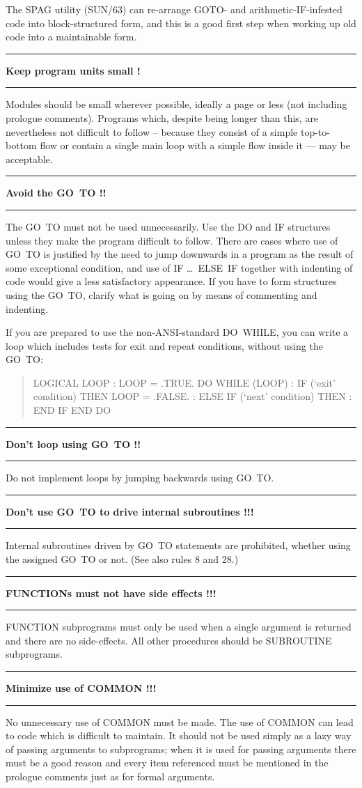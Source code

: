\documentclass[twoside,11pt,nolof,noabs]{starlink}
\newcounter{sruleno}
\providecommand{\srule}[1]{
    \addtocounter{sruleno}{1}
    \goodbreak
    \rule{\textwidth}{0.3mm}
    \textbf{#1} \scpushright{ \textbf{\thesruleno}}
    \rule{\textwidth}{0.1mm}
}
\renewcommand{\_}{{\tt\char'137}}
\begin{document}
The SPAG utility (SUN/63) can re-arrange GOTO- and arithmetic-IF-infested
code into block-structured form, and this is a good first step when
working up old code into a maintainable form.

\srule{Keep program units small !}
Modules should be small wherever possible, ideally a page or less (not
including prologue comments).
Programs which,
despite being longer than this,
are nevertheless not difficult to follow
-- because they consist of a simple top-to-bottom flow or contain a single main
loop with a simple flow inside it --- may be acceptable.

\srule{Avoid the GO~TO !!}
The GO~TO must not be used unnecessarily.
Use the DO and IF structures unless they make the program difficult to follow.
There are cases where use of GO~TO is justified by the need to jump downwards
in a program as the result of some exceptional condition, and use of
IF \ldots\ ELSE~IF together with indenting of code would give a less
satisfactory appearance.  If you have to form structures using
the GO~TO, clarify what is going on by means of commenting and indenting.

\goodbreak
If you are prepared to use the non-ANSI-standard DO~WHILE, you can write a
loop which includes tests for exit and repeat conditions,
without using the GO~TO:
\begin{quote}
\begin{terminalv}
LOGICAL LOOP
     :
LOOP = .TRUE.
DO WHILE (LOOP)
     :
  IF (`exit' condition) THEN
    LOOP = .FALSE.
     :
  ELSE IF (`next' condition) THEN
     :
  END IF
END DO
\end{terminalv}
\end{quote}

\srule{Don't loop using GO~TO !!}
Do not implement loops by jumping backwards using GO~TO.

\srule{Don't use GO~TO to drive internal subroutines !!!}
Internal subroutines driven by GO~TO statements are prohibited,
whether using the assigned GO~TO or not.  (See also rules 8 and 28.)

\srule{FUNCTIONs must not have side effects !!!}
FUNCTION subprograms must only be used when a single argument is returned and
there are no side-effects.
All other procedures should be SUBROUTINE subprograms.

\srule{Minimize use of COMMON !!!}
No unnecessary use of COMMON must be made.
The use of COMMON can lead to code which is difficult to maintain.
It should not be used simply as a lazy way of passing arguments to subprograms;
when it is used for passing arguments there must be a good reason and every item
referenced must be mentioned in the prologue comments just as for formal
arguments.
\end{document}
